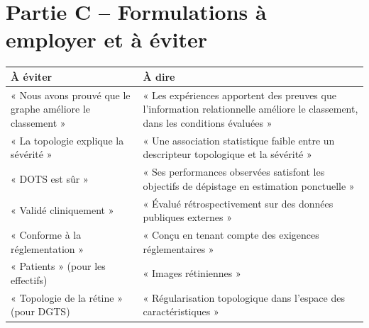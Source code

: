 \documentclass[11pt,a4paper]{article}
\begin{document}
\section*{Partie C -- Formulations à employer et à éviter}
\begin{tabularx}{\linewidth}{@{}>{\color{rouge}}X>{\raggedright\arraybackslash}X@{}}
\toprule
À éviter & À dire \\
\midrule
« Nous avons prouvé que le graphe améliore le classement » & « Les expériences apportent des preuves que l'information relationnelle améliore le classement, dans les conditions évaluées » \\
« La topologie explique la sévérité » & « Une association statistique faible entre un descripteur topologique et la sévérité » \\
« DOTS est sûr » & « Ses performances observées satisfont les objectifs de dépistage en estimation ponctuelle » \\
« Validé cliniquement » & « Évalué rétrospectivement sur des données publiques externes » \\
« Conforme à la réglementation » & « Conçu en tenant compte des exigences réglementaires » \\
« Patients » (pour les effectifs) & « Images rétiniennes » \\
« Topologie de la rétine » (pour DGTS) & « Régularisation topologique dans l'espace des caractéristiques » \\
\bottomrule
\end{tabularx}
\end{document}
